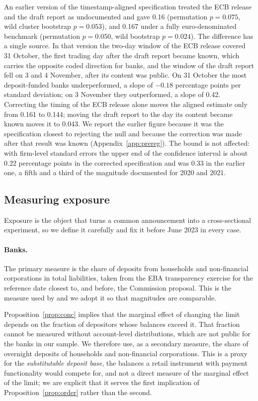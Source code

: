 \documentclass[11pt]{article}
\theoremstyle{plain}\newtheorem{proposition}{Proposition}
\begin{document}
An earlier version of the timestamp-aligned specification treated the ECB release and the draft report as undocumented and gave 0.16 (permutation $p = 0.075$, wild cluster bootstrap $p = 0.053$), and 0.167 under a fully euro-denominated benchmark (permutation $p = 0.050$, wild bootstrap $p = 0.024$). The difference has a single source. In that version the two-day window of the ECB release covered 31 October, the first trading day after the draft report became known, which carries the opposite coded direction for banks, and the window of the draft report fell on 3 and 4 November, after its content was public. On 31 October the most deposit-funded banks underperformed, a slope of $-0.18$ percentage points per standard deviation; on 3 November they outperformed, a slope of 0.42. Correcting the timing of the ECB release alone moves the aligned estimate only from 0.161 to 0.144; moving the draft report to the day its content became known moves it to 0.043. We report the earlier figure because it was the specification closest to rejecting the null and because the correction was made after that result was known (Appendix~\ref{app:prereg}). The bound is not affected: with firm-level standard errors the upper end of the confidence interval is about 0.22 percentage points in the corrected specification and was 0.33 in the earlier one, a fifth and a third of the magnitude documented for 2020 and 2021.

\subsection{Measuring exposure}\label{sec:exposure}

Exposure is the object that turns a common announcement into a cross-sectional experiment, so we define it carefully and fix it before June 2023 in every case.

\paragraph{Banks.} The primary measure is the share of deposits from households and non-financial corporations in total liabilities, taken from the EBA transparency exercise for the reference date closest to, and before, the Commission proposal. This is the measure used by \citet{burlon2024} and we adopt it so that magnitudes are comparable.

Proposition~\ref{prop:conc} implies that the marginal effect of changing the limit depends on the fraction of depositors whose balances exceed it. That fraction cannot be measured without account-level distributions, which are not public for the banks in our sample. We therefore use, as a secondary measure, the share of overnight deposits of households and non-financial corporations. This is a proxy for the \emph{substitutable deposit base}, the balances a retail instrument with payment functionality would compete for, and not a direct measure of the marginal effect of the limit; we are explicit that it serves the first implication of Proposition~\ref{prop:order} rather than the second.
\end{document}
